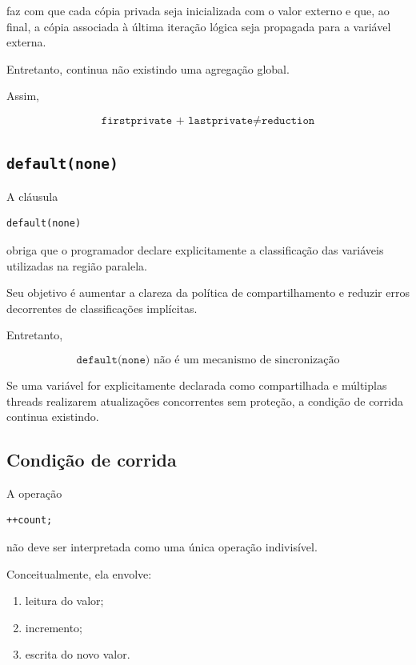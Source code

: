faz com que cada cópia privada seja inicializada com o valor externo e que,
ao final, a cópia associada à última iteração lógica seja propagada para a
variável externa.

Entretanto, continua não existindo uma agregação global.

Assim,

\[
\boxed{
\texttt{firstprivate + lastprivate}
\neq
\texttt{reduction}
}
\]


\subsection{\texttt{default(none)}}

A cláusula

\begin{verbatim}
default(none)
\end{verbatim}

obriga que o programador declare explicitamente a classificação das
variáveis utilizadas na região paralela.

Seu objetivo é aumentar a clareza da política de compartilhamento e reduzir
erros decorrentes de classificações implícitas.

Entretanto,

\[
\boxed{
\texttt{default(none)}
\text{ não é um mecanismo de sincronização}
}
\]

Se uma variável for explicitamente declarada como compartilhada e múltiplas
threads realizarem atualizações concorrentes sem proteção, a condição de
corrida continua existindo.


\subsection{Condição de corrida}

A operação

\begin{verbatim}
++count;
\end{verbatim}

não deve ser interpretada como uma única operação indivisível.

Conceitualmente, ela envolve:

\begin{enumerate}
    \item leitura do valor;
    \item incremento;
    \item escrita do novo valor.
\end{enumerate}


